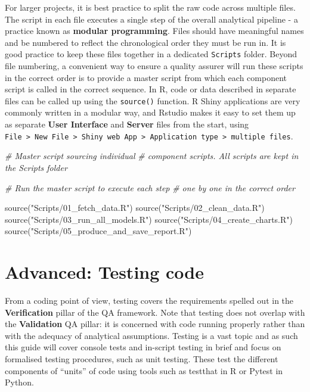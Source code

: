 \documentclass[
]{book}
\newenvironment{Shaded}{\begin{snugshade}}{\end{snugshade}}
\newcommand{\CommentTok}[1]{\textcolor[rgb]{0.56,0.35,0.01}{\textit{#1}}}
\newcommand{\FunctionTok}[1]{\textcolor[rgb]{0.00,0.00,0.00}{#1}}
\newcommand{\NormalTok}[1]{#1}
\newcommand{\StringTok}[1]{\textcolor[rgb]{0.31,0.60,0.02}{#1}}
\begin{document}
For larger projects, it is best practice to split the raw code across multiple files. The script in each file executes a single step of the overall analytical pipeline - a practice known as \textbf{modular programming}. Files should have meaningful names and be numbered to reflect the chronological order they must be run in. It is good practice to keep these files together in a dedicated \texttt{Scripts} folder. Beyond file numbering, a convenient way to ensure a quality assurer will run these scripts in the correct order is to provide a master script from which each component script is called in the correct sequence. In R, code or data described in separate files can be called up using the \texttt{source()} function. R Shiny applications are very commonly written in a modular way, and Rstudio makes it easy to set them up as separate \textbf{User Interface} and \textbf{Server} files from the start, using \texttt{File\ \textgreater{}\ New\ File\ \textgreater{}\ Shiny\ web\ App\ \textgreater{}\ Application\ type\ \textgreater{}\ multiple\ files}.

\begin{Shaded}
\begin{Highlighting}[]
\CommentTok{\# Master script sourcing individual}
\CommentTok{\# component scripts. All scripts are kept in the Scripts folder}

\CommentTok{\# Run the master script to execute each step }
\CommentTok{\# one by one in the correct order}

\FunctionTok{source}\NormalTok{(}\StringTok{"Scripts/01\_fetch\_data.R"}\NormalTok{)}
\FunctionTok{source}\NormalTok{(}\StringTok{"Scripts/02\_clean\_data.R"}\NormalTok{)}
\FunctionTok{source}\NormalTok{(}\StringTok{"Scripts/03\_run\_all\_models.R"}\NormalTok{)}
\FunctionTok{source}\NormalTok{(}\StringTok{"Scripts/04\_create\_charts.R"}\NormalTok{)}
\FunctionTok{source}\NormalTok{(}\StringTok{"Scripts/05\_produce\_and\_save\_report.R"}\NormalTok{)}
\end{Highlighting}
\end{Shaded}

\hypertarget{testing}{%
\chapter{Advanced: Testing code}\label{testing}}

From a coding point of view, testing covers the requirements spelled out in the \textbf{Verification} pillar of the QA framework. Note that testing does not overlap with the \textbf{Validation} QA pillar: it is concerned with code running properly rather than with the adequacy of analytical assumptions. Testing is a vast topic and as such this guide will cover console tests and in-script testing in brief and focus on formalised testing procedures, such as unit testing. These test the different components of ``units'' of code using tools such as testthat in R or Pytest in Python.
\end{document}
